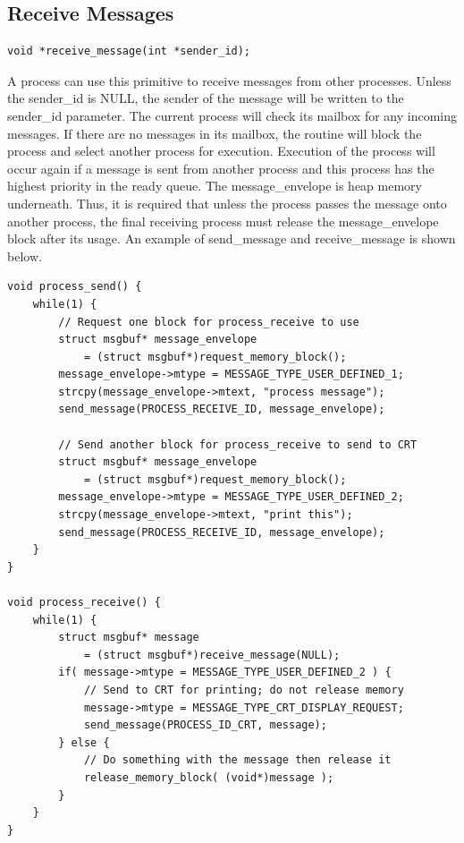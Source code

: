 \documentclass[12pt,twocolumn]{report}
\begin{document}
\subsection{Receive Messages}
\label{sec:receive_message}

\begin{lstlisting}
void *receive_message(int *sender_id);
\end{lstlisting}
\par A process can use this primitive to receive messages from other processes. Unless the sender\_id is NULL, the sender of the message will be written to the sender\_id parameter. The current process will check its mailbox for any incoming messages. If there are no messages in its mailbox, the routine will block the process and select another process for execution. Execution of the process will occur again if a message is sent from another process and this process has the highest priority in the ready queue. The message\_envelope is heap memory underneath. Thus, it is required that unless the process passes the message onto another process, the final receiving process must release the message\_envelope block after its usage. An example of send\_message and receive\_message is shown below.

\begin{lstlisting}
void process_send() {
    while(1) {
        // Request one block for process_receive to use
        struct msgbuf* message_envelope
            = (struct msgbuf*)request_memory_block();
        message_envelope->mtype = MESSAGE_TYPE_USER_DEFINED_1;
        strcpy(message_envelope->mtext, "process message");
        send_message(PROCESS_RECEIVE_ID, message_envelope);

        // Send another block for process_receive to send to CRT
        struct msgbuf* message_envelope
            = (struct msgbuf*)request_memory_block();
        message_envelope->mtype = MESSAGE_TYPE_USER_DEFINED_2;
        strcpy(message_envelope->mtext, "print this");
        send_message(PROCESS_RECEIVE_ID, message_envelope);
    }
}

void process_receive() {
    while(1) {
        struct msgbuf* message
            = (struct msgbuf*)receive_message(NULL);
        if( message->mtype = MESSAGE_TYPE_USER_DEFINED_2 ) {
            // Send to CRT for printing; do not release memory
            message->mtype = MESSAGE_TYPE_CRT_DISPLAY_REQUEST;
            send_message(PROCESS_ID_CRT, message);
        } else {
            // Do something with the message then release it
            release_memory_block( (void*)message );
        }
    }
}
\end{lstlisting}
\end{document}
